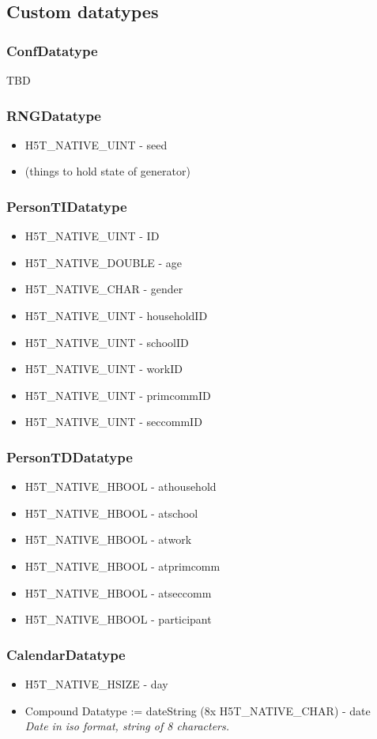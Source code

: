 \documentclass{article}
\begin{document}
		\subsection{Custom datatypes}
			\subsubsection{ConfDatatype}
				TBD
			\subsubsection{RNGDatatype}
				\begin{itemize}
					\item H5T\_NATIVE\_UINT - seed
					\item (things to hold state of generator)
				\end{itemize}
			\subsubsection{PersonTIDatatype}
				\begin{itemize}
					\item H5T\_NATIVE\_UINT - ID
					\item H5T\_NATIVE\_DOUBLE - age
					\item H5T\_NATIVE\_CHAR - gender

					\item H5T\_NATIVE\_UINT - householdID
					\item H5T\_NATIVE\_UINT - schoolID
					\item H5T\_NATIVE\_UINT - workID
					\item H5T\_NATIVE\_UINT - primcommID
					\item H5T\_NATIVE\_UINT - seccommID
				\end{itemize}
			\subsubsection{PersonTDDatatype}
				\begin{itemize}
					\item H5T\_NATIVE\_HBOOL - athousehold
					\item H5T\_NATIVE\_HBOOL - atschool
					\item H5T\_NATIVE\_HBOOL - atwork
					\item H5T\_NATIVE\_HBOOL - atprimcomm
					\item H5T\_NATIVE\_HBOOL - atseccomm
					\item H5T\_NATIVE\_HBOOL - participant
				\end{itemize}
			\subsubsection{CalendarDatatype}
				\begin{itemize}
					\item H5T\_NATIVE\_HSIZE - day
					\item Compound Datatype := dateString (8x H5T\_NATIVE\_CHAR) - date
							\\ \textit{Date in iso format, string of 8 characters.}

				\end{itemize}
\end{document}
